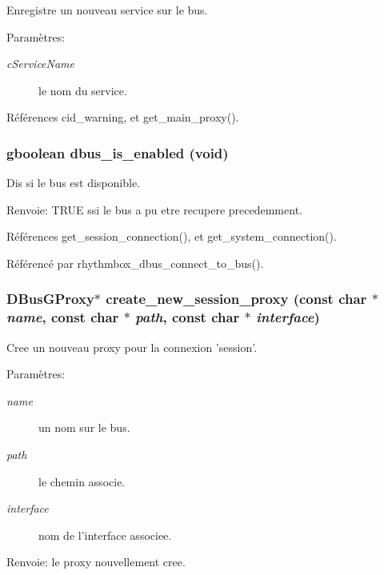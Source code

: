 Enregistre un nouveau service sur le bus. \begin{Desc}
\item[Paramètres:]
\begin{description}
\item[{\em cServiceName}]le nom du service. \end{description}
\end{Desc}


Références cid\_\-warning, et get\_\-main\_\-proxy().
\subsubsection{\setlength{\rightskip}{0pt plus 5cm}gboolean dbus\_\-is\_\-enabled (void)}\label{cid-dbus_8c_019158a96253e21bc8f797ed7232c2e1}


Dis si le bus est disponible. \begin{Desc}
\item[Renvoie:]TRUE ssi le bus a pu etre recupere precedemment. \end{Desc}


Références get\_\-session\_\-connection(), et get\_\-system\_\-connection().

Référencé par rhythmbox\_\-dbus\_\-connect\_\-to\_\-bus().
\subsubsection{\setlength{\rightskip}{0pt plus 5cm}DBusGProxy$\ast$ create\_\-new\_\-session\_\-proxy (const char $\ast$ {\em name}, \/  const char $\ast$ {\em path}, \/  const char $\ast$ {\em interface})}\label{cid-dbus_8c_8b50e30967e56963f7a35ae93e364107}


Cree un nouveau proxy pour la connexion 'session'. \begin{Desc}
\item[Paramètres:]
\begin{description}
\item[{\em name}]un nom sur le bus. \item[{\em path}]le chemin associe. \item[{\em interface}]nom de l'interface associee. \end{description}
\end{Desc}
\begin{Desc}
\item[Renvoie:]le proxy nouvellement cree. \end{Desc}


